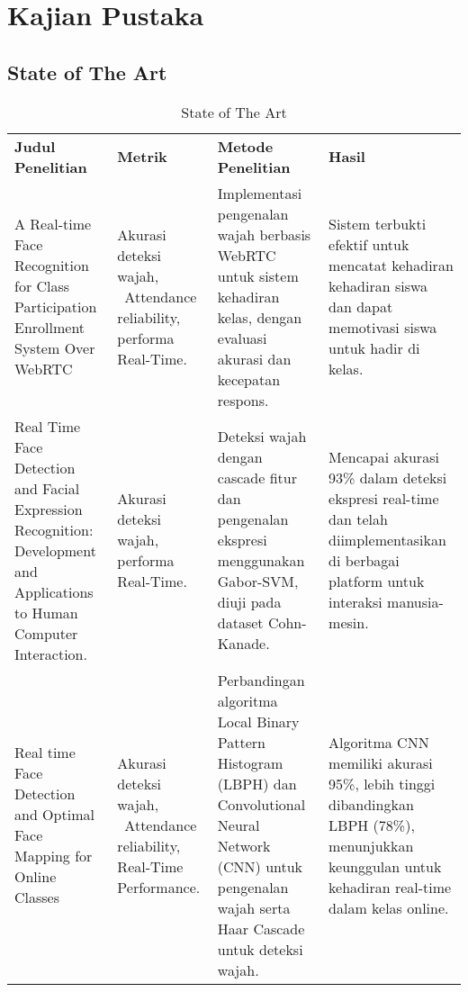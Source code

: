 \chapter{Kajian Pustaka}

\section{State of The Art}

\vspace{-1cm}
\begin{longtable}[t]
{@{}
  |>{\raggedright\arraybackslash}p{}
  |>{\raggedright\arraybackslash}p{}
  |>{\raggedright\arraybackslash}p{}
  |>{\raggedright\arraybackslash}p{}|
@{}}
\endhead
\endlastfoot

\caption{State of The Art} \\

\hline
\textbf{Judul Penelitian} &
\textbf{Metrik} &
\textbf{Metode Penelitian} &
\textbf{Hasil} 

\\ \hline
{A Real-time Face Recognition for Class Participation Enrollment System Over WebRTC} &
{Akurasi deteksi wajah, ~Attendance reliability, performa Real-Time.} &
{Implementasi pengenalan wajah berbasis WebRTC untuk sistem kehadiran kelas, dengan evaluasi akurasi dan kecepatan respons.} &
{Sistem terbukti efektif untuk mencatat kehadiran kehadiran siswa dan dapat memotivasi siswa untuk hadir di kelas.} 

\\ \hline
{Real Time Face Detection and Facial Expression Recognition: Development and Applications to Human Computer Interaction.} &
{Akurasi deteksi wajah, performa Real-Time.} &
{Deteksi wajah dengan cascade fitur dan pengenalan ekspresi menggunakan Gabor-SVM, diuji pada dataset Cohn-Kanade.} &
{Mencapai akurasi 93\% dalam deteksi ekspresi real-time dan telah diimplementasikan di berbagai platform untuk interaksi manusia-mesin.}

\\ \hline
{Real time Face Detection and Optimal Face Mapping for Online Classes} &
{Akurasi deteksi wajah, ~Attendance reliability, Real-Time Performance.} &
{Perbandingan algoritma Local Binary Pattern Histogram (LBPH) dan Convolutional Neural Network (CNN) untuk pengenalan wajah serta Haar Cascade untuk deteksi wajah.} &
{Algoritma CNN memiliki akurasi 95\%, lebih tinggi dibandingkan LBPH (78\%), menunjukkan keunggulan untuk kehadiran real-time dalam kelas online.}


\end{longtable}
